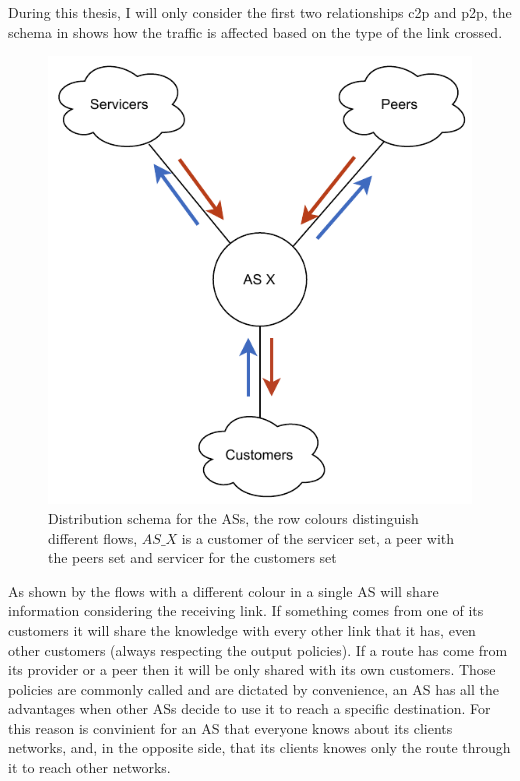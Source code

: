 During this thesis, I will only consider the first two relationships \ac{c2p} and
\ac{p2p}, the schema in  shows how the traffic is affected
based on the type of the link crossed.

\begin{figure}[ht]
    \centering
    \includegraphics[scale=0.75]{images/BGP/ASKnowledgeDistribution.pdf}
	\caption{Distribution schema for the \acp{AS}, the row colours distinguish
	different flows, $AS\_X$ is a customer of the servicer set, a peer with the
	peers set and servicer for the customers set}
    \label{fig:AS_flow}
\end{figure}


As shown by the flows with a different colour in  a single
\ac{AS} will share information considering the receiving link.
If something comes from one of its customers it will share the knowledge with
every other link that it has, even other customers (always respecting the output policies).
If a route has come from its provider or a peer then it will be only shared with
its own customers.
Those policies are commonly called  and are dictated by convenience,
an \ac{AS} has all the advantages when
other \acp{AS} decide to use it to reach a specific destination.
For this reason is convinient for an \ac{AS} that everyone knows about its clients
networks, and, in the opposite side, that its clients knowes only the route
through it to reach other networks.

